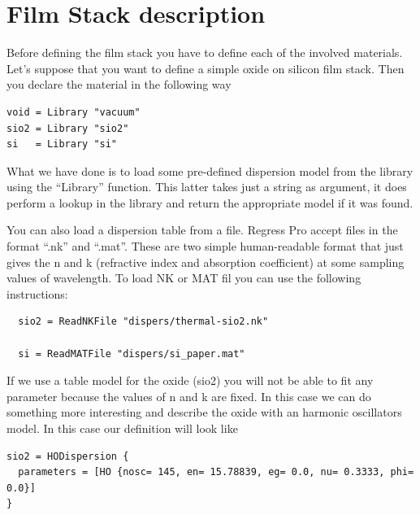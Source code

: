 \documentclass[a4paper]{report}
\begin{document}
\section{Film Stack description}
Before defining the film stack you have to define each of the involved
materials. Let's suppose that you want to define a simple oxide on
silicon film stack. Then you declare the material in the following way

\begin{verbatim}
void = Library "vacuum"
sio2 = Library "sio2"
si   = Library "si"
\end{verbatim}

What we have done is to load some pre-defined dispersion model from the library using the ``Library'' function.
This latter takes just a string as argument, it does perform a lookup in the library and return the appropriate model if it was found.

You can also load a dispersion table from a file.
Regress Pro accept files in the format ``.nk'' and ``.mat''.
These are two simple human-readable format that just gives the n and k (refractive index and absorption coefficient) at some sampling values of wavelength.
To load NK or MAT fil you can use the following instructions:

\begin{verbatim}
  sio2 = ReadNKFile "dispers/thermal-sio2.nk"

  si = ReadMATFile "dispers/si_paper.mat"
\end{verbatim}

If we use a table model for the oxide (sio2) you will not be able to fit any parameter because the values of n and k are fixed.
In this case we can do something more interesting and describe the oxide with an harmonic oscillators model.
In this case our definition will look like
\begin{verbatim}
sio2 = HODispersion {
  parameters = [HO {nosc= 145, en= 15.78839, eg= 0.0, nu= 0.3333, phi= 0.0}]
}
\end{verbatim}
\end{document}
